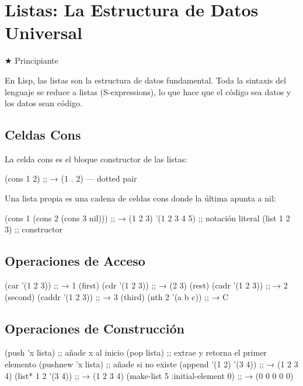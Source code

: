 \chapter{Listas: La Estructura de Datos Universal}
\label{chap:lists}

{\huge$\bigstar$} Principiante

En Lisp, las listas son la estructura de datos fundamental. Toda la sintaxis
del lenguaje se reduce a listas (S-expressions), lo que hace que el código
sea datos y los datos sean código.

\section{Celdas Cons}

La celda cons es el bloque constructor de las listas:

\begin{lispcode}
(cons 1 2)  ;; → (1 . 2)  — dotted pair
\end{lispcode}

Una lista propia es una cadena de celdas cons donde la última apunta a nil:

\begin{lispcode}
(cons 1 (cons 2 (cons 3 nil)))  ;; → (1 2 3)
'(1 2 3 4 5)                     ;; notación literal
(list 1 2 3)                     ;; constructor
\end{lispcode}

\section{Operaciones de Acceso}

\begin{lispcode}
(car '(1 2 3))    ;; → 1  (first)
(cdr '(1 2 3))    ;; → (2 3)  (rest)
(cadr '(1 2 3))   ;; → 2  (second)
(caddr '(1 2 3))  ;; → 3  (third)
(nth 2 '(a b c))  ;; → C
\end{lispcode}

\section{Operaciones de Construcción}

\begin{lispcode}
(push 'x lista)          ;; añade x al inicio
(pop lista)              ;; extrae y retorna el primer elemento
(pushnew 'x lista)       ;; añade si no existe
(append '(1 2) '(3 4))   ;; → (1 2 3 4)
(list* 1 2 '(3 4))       ;; → (1 2 3 4)
(make-list 5 :initial-element 0)  ;; → (0 0 0 0 0)
\end{lispcode}

